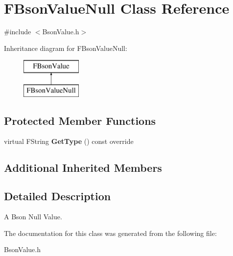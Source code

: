 \hypertarget{class_f_bson_value_null}{}\section{F\+Bson\+Value\+Null Class Reference}
\label{class_f_bson_value_null}


{\ttfamily \#include $<$Bson\+Value.\+h$>$}

Inheritance diagram for F\+Bson\+Value\+Null\+:\begin{figure}[H]
\begin{center}
\leavevmode
\includegraphics[height=2.000000cm]{class_f_bson_value_null}
\end{center}
\end{figure}
\subsection*{Protected Member Functions}
\begin{DoxyCompactItemize}
\item 
\mbox{\label{class_f_bson_value_null_ab34e6a39108cc1f8fad4db16c453c3b6}} 
virtual F\+String {\bfseries Get\+Type} () const override
\end{DoxyCompactItemize}
\subsection*{Additional Inherited Members}


\subsection{Detailed Description}
A Bson Null Value. 

The documentation for this class was generated from the following file\+:\begin{DoxyCompactItemize}
\item 
Bson\+Value.\+h\end{DoxyCompactItemize}
